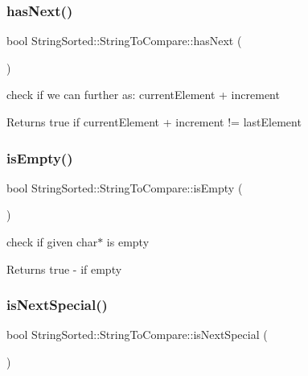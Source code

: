 \subsubsection{\texorpdfstring{has\+Next()}{hasNext()}}
{\footnotesize\ttfamily bool String\+Sorted\+::\+String\+To\+Compare\+::has\+Next (\begin{DoxyParamCaption}{ }\end{DoxyParamCaption})}

check if we can further as\+: current\+Element + increment \begin{DoxyReturn}{Returns}
true if current\+Element + increment != last\+Element 
\end{DoxyReturn}
\mbox{\label{classStringSorted_1_1StringToCompare_a6776b71fc621a8c3d2d3d8320f4d9d8a}} 
\subsubsection{\texorpdfstring{is\+Empty()}{isEmpty()}}
{\footnotesize\ttfamily bool String\+Sorted\+::\+String\+To\+Compare\+::is\+Empty (\begin{DoxyParamCaption}{ }\end{DoxyParamCaption})}

check if given char$\ast$ is empty \begin{DoxyReturn}{Returns}
true -\/ if empty 
\end{DoxyReturn}
\mbox{\label{classStringSorted_1_1StringToCompare_ae57d0863b00ea31b7a4e92b4d5d60253}} 
\subsubsection{\texorpdfstring{is\+Next\+Special()}{isNextSpecial()}}
{\footnotesize\ttfamily bool String\+Sorted\+::\+String\+To\+Compare\+::is\+Next\+Special (\begin{DoxyParamCaption}{ }\end{DoxyParamCaption})}

